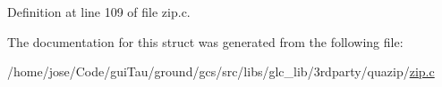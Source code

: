 Definition at line 109 of file zip.\-c.



The documentation for this struct was generated from the following file\-:\begin{DoxyCompactItemize}
\item 
/home/jose/\-Code/gui\-Tau/ground/gcs/src/libs/glc\-\_\-lib/3rdparty/quazip/\hyperlink{zip_8c}{zip.\-c}\end{DoxyCompactItemize}
